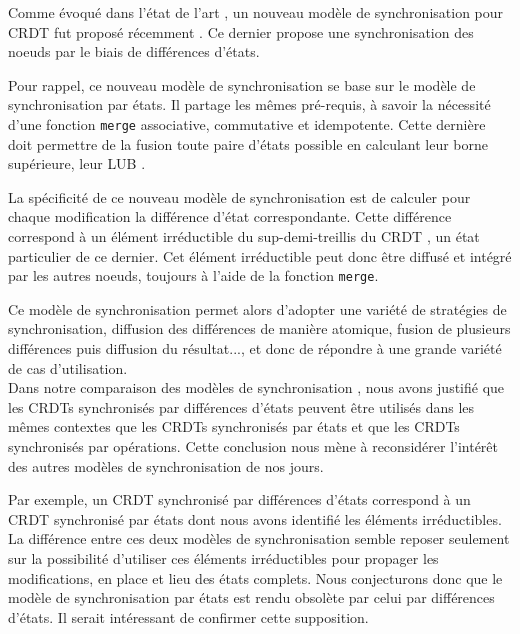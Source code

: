 \label{sec:perspective-comparison-sync-models}
Comme évoqué dans l'état de l'art , un nouveau modèle de synchronisation pour \ac{CRDT} fut proposé récemment \cite{almeida2015delta}.
Ce dernier propose une synchronisation des noeuds par le biais de différences d'états.

Pour rappel, ce nouveau modèle de synchronisation se base sur le modèle de synchronisation par états.
Il partage les mêmes pré-requis, à savoir la nécessité d'une fonction \texttt{merge} associative, commutative et idempotente.
Cette dernière doit permettre de la fusion toute paire d'états possible en calculant leur borne supérieure, \ie leur \ac{LUB} \cite{2018-crdts-perguica-baquero-shapiro}.

La spécificité de ce nouveau modèle de synchronisation est de calculer pour chaque modification la différence d'état correspondante.
Cette différence correspond à un élément irréductible du sup-demi-treillis du \ac{CRDT} \cite{enes2019}, \ie un état particulier de ce dernier.
Cet élément irréductible peut donc être diffusé et intégré par les autres noeuds, toujours à l'aide de la fonction \texttt{merge}.

Ce modèle de synchronisation permet alors d'adopter une variété de stratégies de synchronisation, \eg diffusion des différences de manière atomique, fusion de plusieurs différences puis diffusion du résultat..., et donc de répondre à une grande variété de cas d'utilisation.\\

Dans notre comparaison des modèles de synchronisation , nous avons justifié que les \acp{CRDT} synchronisés par différences d'états peuvent être utilisés dans les mêmes contextes que les \acp{CRDT} synchronisés par états et que les \acp{CRDT} synchronisés par opérations.
Cette conclusion nous mène à reconsidérer l'intérêt des autres modèles de synchronisation de nos jours.

Par exemple, un \ac{CRDT} synchronisé par différences d'états correspond à un \ac{CRDT} synchronisé par états dont nous avons identifié les éléments irréductibles.
La différence entre ces deux modèles de synchronisation semble reposer seulement sur la possibilité d'utiliser ces éléments irréductibles pour propager les modifications, en place et lieu des états complets.
Nous conjecturons donc que le modèle de synchronisation par états est rendu obsolète par celui par différences d'états.
Il serait intéressant de confirmer cette supposition.\\

